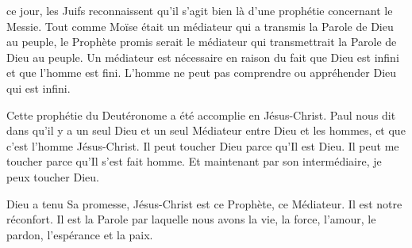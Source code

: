 ce jour, les Juifs reconnaissent qu'il s'agit bien là
 d'une prophétie concernant le Messie.
 Tout comme Moïse était un médiateur qui a transmis la Parole de Dieu au peuple,
 le Prophète promis serait le médiateur qui transmettrait la Parole de Dieu
 au peuple.
 Un médiateur est nécessaire en raison du fait que Dieu est infini et que
 l'homme est fini.
 L'homme ne peut pas comprendre ou appréhender Dieu qui est infini. 




Cette prophétie du Deutéronome a été accomplie en Jésus-Christ.
 Paul nous dit dans  qu'il y a un seul Dieu
 et un seul Médiateur entre Dieu et les hommes,
 et que c'est l'homme Jésus-Christ.
 Il peut toucher Dieu parce qu'Il est Dieu.
 Il peut me toucher parce qu'Il s'est fait homme.
 Et maintenant par son intermédiaire, je peux toucher Dieu.

Dieu a tenu Sa promesse, Jésus-Christ est ce Prophète, ce Médiateur.
 Il est notre réconfort. Il est la Parole par laquelle nous avons la vie,
 la force, l'amour, le pardon, l'espérance et la paix. 

\dvrule





